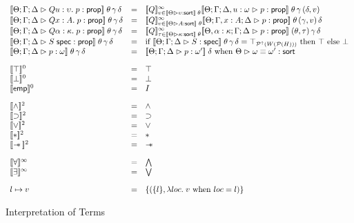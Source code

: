 \begin{figure}
\begin{displaymath}
\begin{array}{lcl}
\interp{\judgeA{Q u:\upsilon.\; p}{\assert}}\;\theta\,\gamma\,\delta & = & 
  \interp{Q}^\infty_{v \in \interp{\judgeSort{\upsilon}}\;\theta}
    \interp{\judgeA[\Theta; \Gamma; \Delta, u:\omega]{p}{\assert}}\;\theta\,\gamma\,(\delta, v) \\

\interp{\judgeA{Q x:A.\; p}{\assert}}\;\theta\,\gamma\,\delta & = & 
  \interp{Q}^\infty_{v \in \interp{\judgeSort{A}}\;\theta}
    \interp{\judgeA[\Theta; \Gamma, x:A; \Delta]{p}{\assert}}\;\theta\,(\gamma,v)\,\delta \\

\interp{\judgeA{Q \alpha:\kappa.\; p}{\assert}}\;\theta\,\gamma\,\delta & = & 
  \interp{Q}^\infty_{\tau \in \interp{\judgeSort{\kappa}}\;\theta}
    \interp{\judgeA[\Theta, \alpha:\kappa; \Gamma; \Delta]{p}{\assert}}\;(\theta, \tau)\,\gamma\,\delta \\


\interp{\judgeA{\validprop{S}}{\assert}}\;\theta\,\gamma\,\delta & = & 
   \mbox{if } \interp{\judgeS{S}}\;\theta\,\gamma\,\delta = \top_{\upset{W(\powerset{H})}}
   \mbox{ then } \top
   \mbox{ else } \bot \\

\interp{\judgeA{p}{\omega}}\;\theta\,\gamma\,\delta & = & 
   \interp{\judgeA{p}{\omega'}}\;\delta \mbox{ when } \judgeSortEq{\omega}{\omega'} \\[1em]

\interp{\top}^0 & = & \top \\
\interp{\bot}^0 & = & \bot \\
\interp{\emp}^0 & = & I \\[1em]

\interp{\land}^2    & = & \land \\
\interp{\implies}^2 & = & \implies \\
\interp{\vee}^2     & = & \vee \\
\interp{*}^2        & = & * \\
\interp{\wand}^2    & = & \wand \\[1em]

\interp{\forall}^\infty & = & \bigwedge \\
\interp{\exists}^\infty & = & \bigvee \\[1em]

l \pointsto v & = & \setof{(\setof{l}, \semfun{loc}{v \mbox{ when } loc = l})}
\end{array}
\end{displaymath}
\caption{ Interpretation of Terms }
\label{term-interpretation}  
\end{figure}

